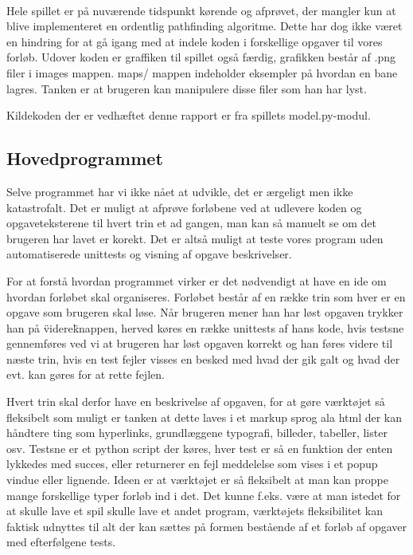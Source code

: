 \documentclass[10pt,a4paper,danish]{article}
\begin{document}
\paragraph{}
Hele spillet er på nuværende tidspunkt kørende og afprøvet, der mangler kun at blive implementeret en ordentlig pathfinding algoritme. Dette har dog ikke været en hindring for at gå igang med at indele koden i forskellige opgaver til vores forløb.
Udover koden er graffiken til spillet også færdig, grafikken består af .png filer i images mappen.  maps/ mappen indeholder eksempler på hvordan en bane lagres.
Tanken er at brugeren kan manipulere disse filer som han har lyst.

Kildekoden der er vedhæftet denne rapport er fra spillets model.py-modul.



\subsection{Hovedprogrammet}

Selve programmet har vi ikke nået at udvikle, det er ærgeligt men ikke katastrofalt. Det er muligt at afprøve forløbene ved at udlevere koden og opgaveteksterene til hvert trin et ad gangen, man kan så manuelt se om det brugeren har lavet er korekt. Det er altså muligt at teste vores program uden automatiserede unittests og visning af opgave beskrivelser.

For at forstå hvordan programmet virker er det nødvendigt at have en ide om hvordan forløbet skal organiseres.
Forløbet består af en række trin som hver er en opgave som brugeren skal løse. Når brugeren mener han har løst opgaven trykker han på \"videre\" knappen, herved køres en række unittests af hans kode, hvis testsne gennemføres ved vi at brugeren har løst opgaven korrekt og han føres videre til næste trin, hvis en test fejler visses en besked med hvad der gik galt og hvad der evt. kan gøres for at rette fejlen.

Hvert trin skal derfor have en beskrivelse af opgaven, for at gøre værktøjet så fleksibelt som muligt er tanken at dette laves i et markup sprog ala html der kan håndtere ting som hyperlinks, grundlæggene typografi, billeder, tabeller, lister osv. Testsne er et python script der køres, hver test er så en funktion der enten lykkedes med succes, eller returnerer en fejl meddelelse som vises i et popup vindue eller lignende. Ideen er at værktøjet er så fleksibelt at man kan proppe mange forskellige typer forløb ind i det. Det kunne f.eks. være at man istedet for at skulle lave et spil skulle lave et andet program, værktøjets fleksibilitet kan faktisk udnyttes til alt der kan sættes på formen bestående af et forløb af opgaver med efterfølgene tests.
\end{document}
